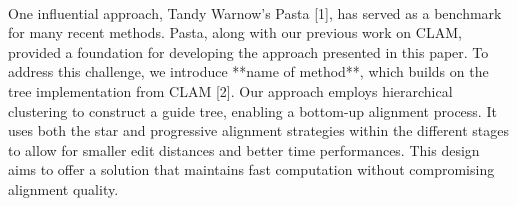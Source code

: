 \\One influential approach, Tandy Warnow's Pasta [1], has served as a benchmark for many recent methods. Pasta, along with our previous work on CLAM, provided a foundation for developing the approach presented in this paper. To address this challenge, we introduce **name of method**, which builds on the tree implementation from CLAM [2]. Our approach employs hierarchical clustering to construct a guide tree, enabling a bottom-up alignment process. It uses both the star and progressive alignment strategies within the different stages to allow for smaller edit distances and better time performances. This design aims to offer a solution that maintains fast computation without compromising alignment quality. \cite{mirarab2015astral}
